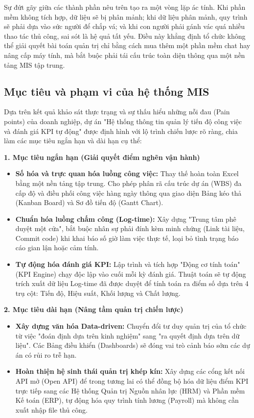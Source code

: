 \documentclass[a4paper,13.5pt]{extreport}
\begin{document}
Sự đứt gãy giữa các thành phần nêu trên tạo ra một vòng lặp ác tính. Khi phần mềm không tích hợp, dữ liệu sẽ bị phân mảnh; khi dữ liệu phân mảnh, quy trình sẽ phải dựa vào sức người để chắp vá; và khi con người phải gánh vác quá nhiều thao tác thủ công, sai sót là hệ quả tất yếu. Điều này khẳng định tổ chức không thể giải quyết bài toán quản trị chỉ bằng cách mua thêm một phần mềm chat hay nâng cấp máy tính, mà bắt buộc phải tái cấu trúc toàn diện thông qua một nền tảng MIS tập trung.

\subsection{Mục tiêu và phạm vi của hệ thống MIS}

Dựa trên kết quả khảo sát thực trạng và sự thấu hiểu những nỗi đau (Pain points) của doanh nghiệp, dự án "Hệ thống thông tin quản lý tiến độ công việc và đánh giá KPI tự động" được định hình với lộ trình chiến lược rõ ràng, chia làm các mục tiêu ngắn hạn và dài hạn cụ thể:

\textbf{1. Mục tiêu ngắn hạn (Giải quyết điểm nghẽn vận hành)}
\begin{itemize}
    \item \textbf{Số hóa và trực quan hóa luồng công việc:} Thay thế hoàn toàn Excel bằng một nền tảng tập trung. Cho phép phân rã cấu trúc dự án (WBS) đa cấp độ và điều phối công việc hàng ngày thông qua giao diện Bảng kéo thả (Kanban Board) và Sơ đồ tiến độ (Gantt Chart).
    \item \textbf{Chuẩn hóa luồng chấm công (Log-time):} Xây dựng "Trung tâm phê duyệt một cửa", bắt buộc nhân sự phải đính kèm minh chứng (Link tài liệu, Commit code) khi khai báo số giờ làm việc thực tế, loại bỏ tình trạng báo cáo gian lận hoặc cảm tính.
    \item \textbf{Tự động hóa đánh giá KPI:} Lập trình và tích hợp "Động cơ tính toán" (KPI Engine) chạy độc lập vào cuối mỗi kỳ đánh giá. Thuật toán sẽ tự động trích xuất dữ liệu Log-time đã được duyệt để tính toán ra điểm số dựa trên 4 trụ cột: Tiến độ, Hiệu suất, Khối lượng và Chất lượng.
\end{itemize}

\textbf{2. Mục tiêu dài hạn (Nâng tầm quản trị chiến lược)}
\begin{itemize}
    \item \textbf{Xây dựng văn hóa Data-driven:} Chuyển đổi tư duy quản trị của tổ chức từ việc "đoán định dựa trên kinh nghiệm" sang "ra quyết định dựa trên dữ liệu". Các Bảng điều khiển (Dashboards) sẽ đóng vai trò cảnh báo sớm các dự án có rủi ro trễ hạn.
    \item \textbf{Hoàn thiện hệ sinh thái quản trị khép kín:} Xây dựng các cổng kết nối API mở (Open API) để trong tương lai có thể đồng bộ hóa dữ liệu điểm KPI trực tiếp sang các Hệ thống Quản trị Nguồn nhân lực (HRM) và Phần mềm Kế toán (ERP), tự động hóa quy trình tính lương (Payroll) mà không cần xuất nhập file thủ công.
\end{itemize}
\end{document}
